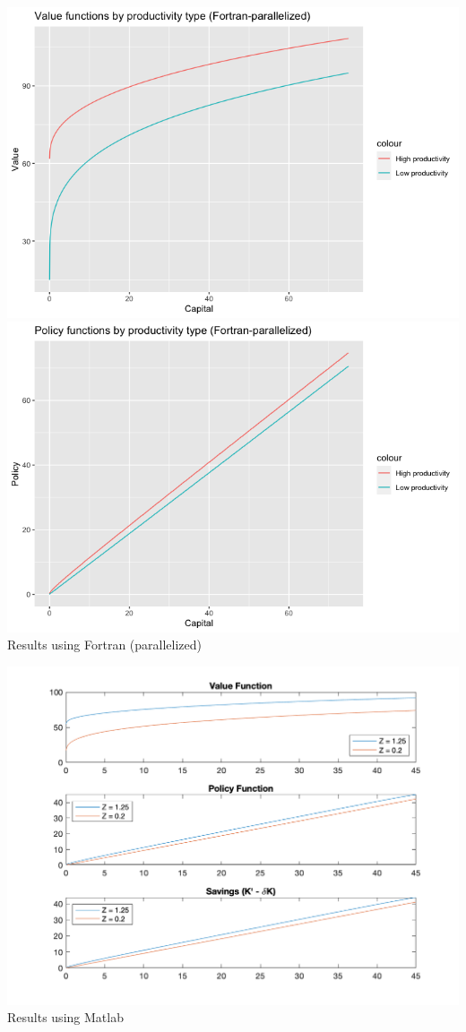 \documentclass[12pt]{article}
\begin{document}
    \begin{center}
        \includegraphics[scale=0.4]{for_par_vf.png}\\
        \includegraphics[scale=0.4]{for_par_pf.png}\\
        Results using Fortran (parallelized)
    \end{center}
    \begin{center}
        \includegraphics[]{ps1_matlab_figures.png}
        Results using Matlab
    \end{center}
\end{document}
